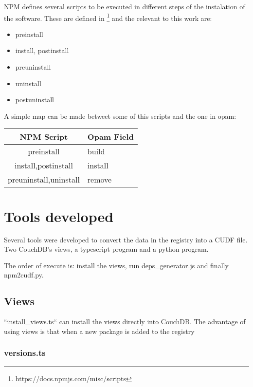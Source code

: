 \documentclass[letterpaper,12pt]{report}
\begin{document}
NPM defines several scripts to be executed in different steps of the instalation
of the software. These are defined in
\footnote{https://docs.npmjs.com/misc/scripts} and the relevant to this work
are:

\begin{itemize}
    \item preinstall
    \item install, postinstall
    \item preuninstall
    \item uninstall
    \item postuninstall
\end{itemize}

A simple map can be made betweet some of this scripts and the one in opam:


\begin{tabularx}{\textwidth}{|c|X|}
        \hline
        NPM Script              & Opam Field    \\ \hline \hline
        preinstall              & build         \\ \hline
        install,postinstall     & install       \\ \hline
        preuninstall,uninstall  & remove        \\ \hline
        \hline
\end{tabularx}



\section{Tools developed}

Several tools were developed to convert the data in the registry into a CUDF
file. Two CouchDB's views, a typescript program and a python program.

The order of execute is: install the views, run deps\_generator.js and finally
npm2cudf.py.

\subsection{Views}

``install\_views.ts`` can install the views directly into CouchDB. The advantage
of using views is that when a new package is added to the registry 

\subsubsection{versions.ts}
\end{document}
